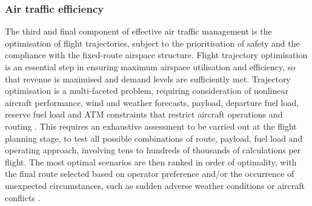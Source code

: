 

\subsubsection{Air traffic efficiency}
The third and final component of effective air traffic management is the optimisation of flight trajectories, subject to the prioritisation of safety and the compliance with the fixed-route airspace structure. Flight trajectory optimisation is an essential step in ensuring maximum airspace utilisation and efficiency, so that revenue is maximised and demand levels are sufficiently met. Trajectory optimisation is a multi-faceted problem, requiring consideration of nonlinear aircraft performance, wind and weather forecasts, payload, departure fuel load, reserve fuel load and ATM constraints that restrict aircraft operations and routing \cite{Soler2015}. This requires an exhaustive assessment to be carried out at the flight planning stage, to test all possible combinations of route, payload, fuel load and operating approach, involving tens to hundreds of thousands of calculations per flight. The most optimal scenarios are then ranked in order of optimality, with the final route selected based on operator preference and/or the occurrence of unexpected circumstances, such as sudden adverse weather conditions or aircraft conflicts \cite{Altus}.

